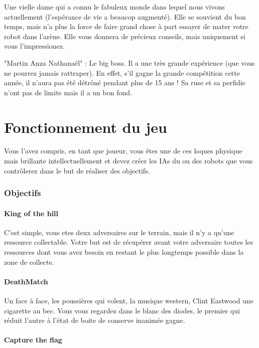 \documentclass[10pt]{article}
\begin{document}
Une vielle dame qui a connu le fabuleux monde dans lequel nous vivons actuellement (l'espérance de vie a beaucop augmenté). Elle se souvient du bon temps, mais n'a plus la force de faire grand chose à part essayer de mater votre robot dans l'arène. Elle vous donnera de précieux conseils, mais uniquement si vous l'impressionez.

"Martin Anza Nathanaël" : Le big boss. Il a une très grande expérience (que vous ne pourrez jamais rattraper). En effet, s'il gagne la grande compétition cette année, il n'aura pas été détrôné pendant plus de 15 ans ! Sa ruse et sa perfidie n'ont pas de limite mais il a un bon fond.

\newpage
\setcounter{section}{0}
\part{Fonctionnement du jeu}

Vous l'avez compris, en tant que joueur, vous êtes une de ces loques physique mais brillante intellectuellement et devez créer les IAs du ou des robots que vous contrôlerez dans le but de réaliser des objectifs.

\section{Objectifs}
\subsection{King of the hill}

C'est simple, vous etes deux adversaires sur le terrain, mais il n'y a qu'une ressource collectable. Votre but est de récupérer avant votre adversaire toutes les ressources dont vous avez besoin en restant le plus longtemps possible dans la zone de collecte.

\subsection{DeathMatch}

Un face à face, les poussières qui volent, la musique western, Clint Eastwood une cigarette au bec. Vous vous regardez dans le blanc des diodes, le premier qui réduit l'autre à l'état de boite de conserve inanimée gagne.

\subsection{Capture the flag}
\end{document}
